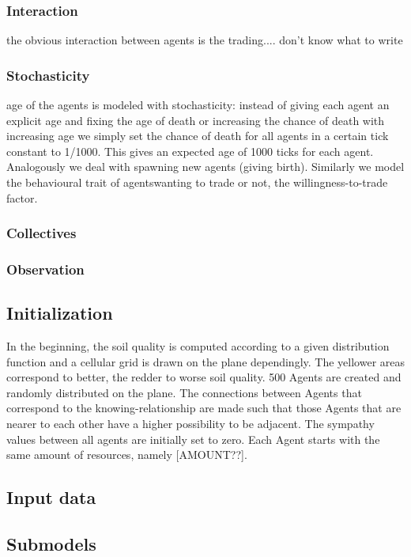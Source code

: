 \documentclass{JASSS}
\begin{document}
\subsubsection{Interaction}
	the obvious interaction between agents is the trading.... don't know what to write

\subsubsection{Stochasticity}
	age of the agents is modeled with stochasticity: instead of giving each agent an explicit age and fixing the age of death or increasing the chance of death with increasing age we simply set the chance of death for all agents in a certain tick constant to 1/1000. This gives an expected age of 1000 ticks for each agent. Analogously we deal with spawning new agents (giving birth). Similarly we model the behavioural trait of agentswanting to trade or not, the willingness-to-trade factor.  

\subsubsection{Collectives}
\subsubsection{Observation}

\subsection{Initialization}
	In the beginning, the soil quality is computed according to a given distribution function and a cellular grid is drawn on the plane dependingly. The yellower areas correspond to better, the redder to worse soil quality. 500 Agents are created and randomly distributed on the plane. The connections between Agents that correspond to the knowing-relationship are made such that those Agents that are nearer to each other have a higher possibility to be adjacent. The sympathy values between all agents are initially set to zero. Each Agent starts with the same amount of resources, namely [AMOUNT??].

\subsection{Input data}
\subsection{Submodels}
\end{document}
